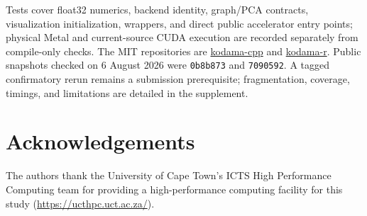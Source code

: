 \documentclass[twoside,11pt]{article}
\begin{document}
Tests cover float32 numerics, backend identity, graph/PCA contracts, visualization initialization, wrappers, and direct public accelerator entry points; physical Metal and current-source CUDA execution are recorded separately from compile-only checks. The MIT repositories are \href{https://github.com/tkcaccia/kodama-cpp}{kodama-cpp} and \href{https://github.com/tkcaccia/kodama-r}{kodama-r}. Public snapshots checked on 6 August 2026 were \texttt{0b8b873} and \texttt{7090592}. A tagged confirmatory rerun remains a submission prerequisite; fragmentation, coverage, timings, and limitations are detailed in the supplement.

\section*{Acknowledgements}
The authors thank the University of Cape Town's ICTS High Performance Computing team for providing a high-performance computing facility for this study (\url{https://ucthpc.uct.ac.za/}).

\newpage

\end{document}
